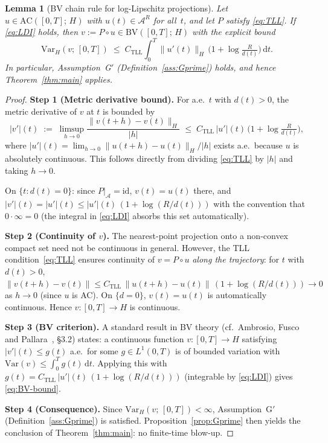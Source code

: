 \documentclass[12pt,a4paper]{article}
\theoremstyle{definition}
\theoremstyle{plain}
\newtheorem{lemma}[definition]{Lemma}
\theoremstyle{remark}
\begin{document}
\begin{lemma}[BV chain rule for log-Lipschitz projections]
\label{lem:LL-BV}
Let $u \in \mathrm{AC}([0,T];\,H)$ with $u(t) \in \mathcal{A}^R$
for all~$t$, and let $P$ satisfy \eqref{eq:TLL}.
If \eqref{eq:LDI} holds, then $v := P\circ u \in \mathrm{BV}([0,T];\,H)$
with the explicit bound
\begin{equation}\label{eq:BV-bound}
  \mathrm{Var}_H(v;\,[0,T])
  \;\le\;
  C_{\mathrm{TLL}}
  \int_0^T \|u'(t)\|_H\,
  \bigl(1 + \log\tfrac{R}{d(t)}\bigr)\,\mathrm{d}t.
\end{equation}
In particular, Assumption~G$'$
\textup{(}Definition~\ref{ass:Gprime}\textup{)} holds, and hence
Theorem~\ref{thm:main} applies.
\end{lemma}

\begin{proof}
\textbf{Step 1 (Metric derivative bound).}\;
For a.e.\ $t$ with $d(t)>0$, the metric derivative of $v$ at $t$
is bounded by
\[
  |v'|(t)
  \;:=\;
  \limsup_{h\to 0}\frac{\|v(t+h)-v(t)\|_H}{|h|}
  \;\le\;
  C_{\mathrm{TLL}}\,|u'|(t)\,
  \bigl(1 + \log\tfrac{R}{d(t)}\bigr),
\]
where $|u'|(t) = \lim_{h\to 0}\|u(t+h)-u(t)\|_H/|h|$ exists a.e.\
because $u$ is absolutely continuous.  This follows directly from
dividing \eqref{eq:TLL} by $|h|$ and taking $h\to 0$.

On $\{t : d(t)=0\}$: since $P|_{\mathcal{A}} = \mathrm{id}$,
$v(t) = u(t)$ there, and $|v'|(t) = |u'|(t) \le |u'|(t)\,
(1+\log(R/d(t)))$ with the convention that $0 \cdot \infty = 0$
(the integral in \eqref{eq:LDI} absorbs this set automatically).

\medskip
\noindent
\textbf{Step 2 (Continuity of $v$).}\;
The nearest-point projection onto a non-convex compact set need not be
continuous in general.  However, the TLL condition~\eqref{eq:TLL}
ensures continuity of $v = P\circ u$ \emph{along the trajectory}:
for $t$ with $d(t) > 0$,
$\|v(t+h)-v(t)\| \le C_{\mathrm{TLL}}\,\|u(t+h)-u(t)\|\,
(1+\log(R/d(t))) \to 0$ as $h \to 0$
(since $u$ is AC).  On $\{d=0\}$, $v(t)=u(t)$ is automatically
continuous.  Hence $v: [0,T] \to H$ is continuous.

\medskip
\noindent
\textbf{Step 3 (BV criterion).}\;
A standard result in BV theory (cf.\ Ambrosio, Fusco and
Pallara~\cite{AmbrosioFuscoPallara2000}, \S3.2) states: a continuous
function $v: [0,T] \to H$ satisfying
$|v'|(t) \le g(t)$ a.e.\ for some $g \in L^1(0,T)$ is of bounded
variation with $\mathrm{Var}(v) \le \int_0^T g(t)\,\mathrm{d}t$.
Applying this with $g(t) = C_{\mathrm{TLL}}\,|u'|(t)\,
(1+\log(R/d(t)))$ (integrable by \eqref{eq:LDI}) gives
\eqref{eq:BV-bound}.

\medskip
\noindent
\textbf{Step 4 (Consequence).}\;
Since $\mathrm{Var}_H(v;\,[0,T]) < \infty$, Assumption~G$'$
(Definition~\ref{ass:Gprime}) is satisfied.
Proposition~\ref{prop:Gprime} then yields the conclusion of
Theorem~\ref{thm:main}: no finite-time blow-up.
\end{proof}
\end{document}
